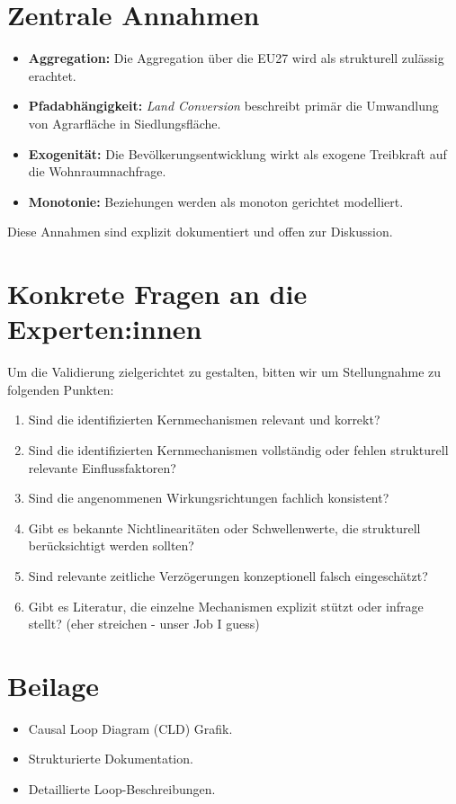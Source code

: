 \documentclass[11pt, a4paper, oneside]{scrartcl}
\begin{document}
\section{Zentrale Annahmen}
\begin{itemize}
  \item \textbf{Aggregation:} Die Aggregation über die EU27 wird als strukturell zulässig erachtet.
  \item \textbf{Pfadabhängigkeit:} \textit{Land Conversion} beschreibt primär die Umwandlung von Agrarfläche in Siedlungsfläche.
  \item \textbf{Exogenität:} Die Bevölkerungsentwicklung wirkt als exogene Treibkraft auf die Wohnraumnachfrage.
  \item \textbf{Monotonie:} Beziehungen werden als monoton gerichtet modelliert.
\end{itemize}

Diese Annahmen sind explizit dokumentiert und offen zur Diskussion.

\section{Konkrete Fragen an die Experten:innen}
Um die Validierung zielgerichtet zu gestalten, bitten wir um Stellungnahme zu folgenden Punkten:

\begin{enumerate}
  \item Sind die identifizierten Kernmechanismen relevant und korrekt? 
  \item Sind die identifizierten Kernmechanismen vollständig oder fehlen strukturell relevante Einflussfaktoren?
  \item Sind die angenommenen Wirkungsrichtungen fachlich konsistent?
  \item Gibt es bekannte Nichtlinearitäten oder Schwellenwerte, die strukturell berücksichtigt werden sollten?
  \item Sind relevante zeitliche Verzögerungen konzeptionell falsch eingeschätzt?
  \item Gibt es Literatur, die einzelne Mechanismen explizit stützt oder infrage stellt? (eher streichen - unser Job I guess)
\end{enumerate}

\section{Beilage}
\begin{itemize}
  \item Causal Loop Diagram (CLD) Grafik.
  \item Strukturierte Dokumentation.
  \item Detaillierte Loop-Beschreibungen.
\end{itemize}
\end{document}
